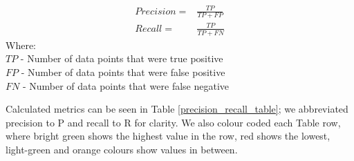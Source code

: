 \begin{equation}\label{prec_rec_equ}
    \begin{aligned}
        Precision ={}  & \frac{TP}{TP + FP} \\
        Recall    ={}  & \frac{TP}{TP + FN}
    \end{aligned}
\end{equation}
\clearpage
Where:\\
$TP$ - Number of data points that were true positive\\
$FP$ - Number of data points that were false positive\\
$FN$ - Number of data points that were false negative

Calculated metrics can be seen in Table \ref{precision_recall_table}; we abbreviated precision to P and recall to R for clarity.
We also colour coded each Table row, where bright green shows the highest value in the row, red shows the lowest, light-green and orange colours show values in between.
\newline
